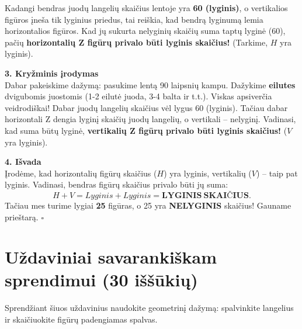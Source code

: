 \documentclass[11pt,a4paper]{scrartcl}
\newenvironment{solution}
    {\begin{list}{}{\setlength{\leftmargin}{10pt}\setlength{\rightmargin}{10pt}}\item[]}
    {\end{list}}
\begin{document}
\begin{solution}
Kadangi bendras juodų langelių skaičius lentoje yra \textbf{60 (lyginis)}, o vertikalios figūros įneša tik lyginius priedus, tai reiškia, kad bendrą lyginumą lemia horizontalios figūros. Kad jų sukurta nelyginių skaičių suma taptų lyginė (60), pačių \textbf{horizontalių Z figūrų privalo būti lyginis skaičius!} (Tarkime, $H$ yra lyginis).

\vspace{0.5cm}
\textbf{3. Kryžminis įrodymas} \\
Dabar pakeiskime dažymą: pasukime lentą 90 laipsnių kampu. Dažykime \textbf{eilutes} dvigubomis juostomis (1-2 eilutė juoda, 3-4 balta ir t.t.). Viskas apsiverčia veidrodiškai!
Dabar juodų langelių skaičius vėl lygus 60 (lyginis). Tačiau dabar horizontali Z dengia lyginį skaičių juodų langelių, o vertikali – nelyginį. Vadinasi, kad suma būtų lyginė, \textbf{vertikalių Z figūrų privalo būti lyginis skaičius!} ($V$ yra lyginis).

\textbf{4. Išvada} \\
Įrodėme, kad horizontalių figūrų skaičius ($H$) yra lyginis, vertikalių ($V$) – taip pat lyginis. 
Vadinasi, bendras figūrų skaičius privalo būti jų suma:
\[ H + V = Lyginis + Lyginis = \mathbf{LYGINIS \ SKAIČIUS}. \]
Tačiau mes turime lygiai \textbf{25} figūras, o 25 yra \textbf{NELYGINIS} skaičius! 
Gauname prieštarą. \hfill $\square$
\end{solution}

\newpage
\section{Uždaviniai savarankiškam sprendimui (30 iššūkių)}

Sprendžiant šiuos uždavinius naudokite geometrinį dažymą: spalvinkite langelius ir skaičiuokite figūrų padengiamas spalvas.
\end{document}
